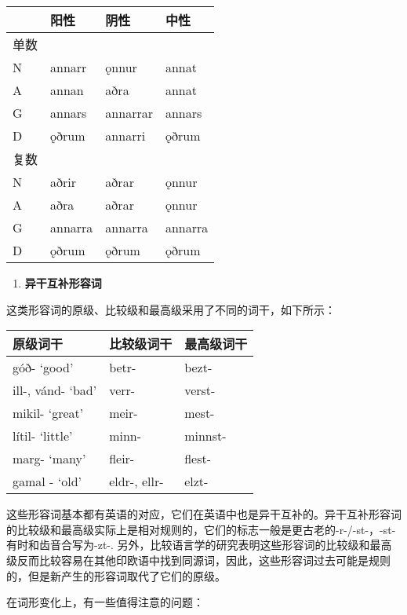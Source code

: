 \begin{longtable}{llll}
\toprule
 & 阳性 & 阴性 & 中性 \\
\midrule
\endhead
\bottomrule
\endfoot
单数 & & & \\
N & annarr & ǫnnur & annat \\
A & annan & aðra & annat \\
G & annars & annarrar & annars \\
D & ǫðrum & annarri & ǫðrum \\
复数 & & & \\
N & aðrir & aðrar & ǫnnur \\
A & aðra & aðrar & ǫnnur \\
G & annarra & annarra & annarra \\
D & ǫðrum & ǫðrum & ǫðrum \\
\end{longtable}

\begin{enumerate}
\def\labelenumi{\arabic{enumi})}
\setcounter{enumi}{1}
\item
  \textbf{异干互补形容词}
\end{enumerate}

这类形容词的原级、比较级和最高级采用了不同的词干，如下所示：

\begin{longtable}{lll}
\toprule
原级词干 & 比较级词干 & 最高级词干 \\
\midrule
\endhead
\bottomrule
\endfoot
góð- `good‌' & betr- & bezt- \\
ill-, vánd- `bad‌' & verr- & verst- \\
mikil- `great‌' & meir- & mest- \\
lítil- `little‌' & minn- & minnst- \\
marg- `many‌' & fleir- & flest- \\
gamal - `old‌' & eldr-, ellr- & elzt- \\
\end{longtable}

这些形容词基本都有英语的对应，它们在英语中也是异干互补的。异干互补形容词的比较级和最高级实际上是相对规则的，它们的标志一般是更古老的-r-/-st-，-st-有时和齿音合写为-zt-.
另外，比较语言学的研究表明这些形容词的比较级和最高级反而比较容易在其他印欧语中找到同源词，因此，这些形容词过去可能是规则的，但是新产生的形容词取代了它们的原级。

在词形变化上，有一些值得注意的问题：

